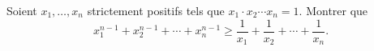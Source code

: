Soient $x_1, \ldots, x_n$ strictement positifs tels que $x_1 \cdot x_2 \cdots x_n = 1$. Montrer que
\[ x_1^{n-1} + x_2^{n-1} + \cdots + x_n^{n-1} \geq \frac{1}{x_1} + \frac{1}{x_2} + \cdots + \frac{1}{x_n}. \]
